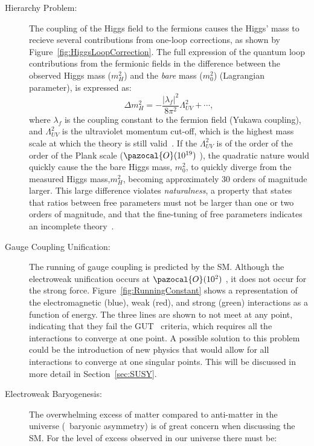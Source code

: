 	\begin{description}
		\item[Hierarchy Problem:] The coupling of the Higgs field to the fermions causes the Higgs' mass to recieve several contributions from one-loop corrections, as shown by Figure~\ref{fig:HiggsLoopCorrection}.
		The full expression of the quantum loop contributions from the fermionic fields %
		 in the difference between the observed Higgs mass ($m_H^2$)  and the \textit{bare} mass ($m_0^2$) (Lagrangian parameter), is expressed as:
		\begin{equation}
		\Delta m_H^2 = -\frac{|\lambda_f|^2}{8\pi^2}\Lambda^2_{UV}+\cdots,
		\end{equation}
		where $\lambda_f$ is the coupling constant to the fermion field (Yukawa coupling), and $\Lambda^2_{UV}$ is the ultraviolet momentum cut-off, which is the highest mass scale at which the theory is still valid~\cite{Weinberg1976}.
		 If the $\Lambda^2_{UV}$ is of the order of the order of the Plank scale ($\pazocal{O}(10^{19})$ \gev), the quadratic nature would quickly cause the the bare Higgs mass, $m_0^2$, to quickly diverge from the measured Higgs mass,$m_H^2$, becoming approximately 30 orders of magnitude larger. This large difference violates \textit{naturalness}, a property that states that ratios between free parameters must not be larger than one or two orders of magnitude, and that the fine-tuning of free parameters indicates an incomplete theory~\cite{Chan_1998,Hall2012}.
		\HiggsLoopCorrection
		\item[Gauge Coupling Unification:] The running of gauge coupling is predicted by the \ac{SM}. Although the electroweak unification occurs at $\pazocal{O}(10^2)$ \gev, it does not occur for the strong force. Figure~\ref{fig:RunningConstant} shows a representation of the electromagnetic (blue), weak (red), and strong (green) interactions as a function of energy. The three lines are shown to not meet at any point, indicating that they fail the \ac{GUT}~\cite{ross1984grand} criteria, which requires all the interactions to converge at one point. A possible solution to this problem could be the introduction of new physics that would allow for all interactions to converge at one singular points. This will be discussed in more detail in Section~\ref{sec:SUSY}.
		\RunningConstant
	\item[Electroweak Baryogenesis:] The overwhelming excess of matter compared to anti-matter in the universe (\ie\  baryonic asymmetry) is of great concern when discussing the \ac{SM}. For the level of excess observed in our universe there must be:

\end{description}
